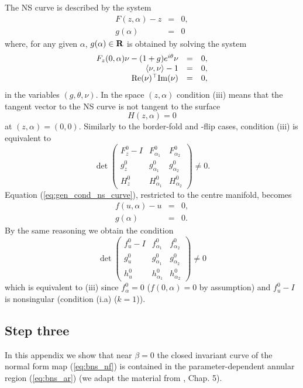 \documentclass[final,onefignum]{siamltex}
\begin{document}
The NS curve is described by the system 
\begin{equation}
\label{eq:gen_cond_ns_curve}
\begin{array}{rcl}
 F(z,\alpha)-z & = & 0,\\
 g(\alpha) & = & 0
\end{array}
\end{equation}
where, for any given $\alpha$, $g(\alpha)\in{{\bf R}}$ is obtained by solving the system
$$
\begin{array}{rcl}
 F_z(0,\alpha)\nu - (1+g)e^{i\theta}\nu & = & 0,\\
 \langle\nu,\nu\rangle -1 & = & 0,\\
 \mathrm{Re}(\nu){^{{\scriptscriptstyle}\top}}\mathrm{Im}(\nu) & = & 0,
\end{array}
$$
in the variables $(g,\theta,\nu)$.  In the space $(z,\alpha)$ condition (iii) means that the tangent vector to the NS curve is not tangent to the surface 
$$
H(z,\alpha)=0
$$
at $(z,\alpha)=(0,0)$.  Similarly to the border-fold and -flip cases, condition (iii) is equivalent to
$$
\det
\left(
\begin{array}{ccc}
F^0_z-I & F^0_{\alpha_1} & F^0_{\alpha_2}\\
g^0_z & g^0_{\alpha_1} & g^0_{\alpha_2}\\
H^0_z & H^0_{\alpha_1} & H^0_{\alpha_2}
\end{array}
\right)\neq 0.
$$
Equation (\ref{eq:gen_cond_ns_curve}), restricted to the centre manifold, becomes
$$
\begin{array}{rcl}
 f(u,\alpha)-u & = & 0,\\ g(\alpha) & = & 0.
\end{array}
$$
By the same reasoning we obtain the condition 
$$
\det
\left(
\begin{array}{ccc}
f^0_u-I & f^0_{\alpha_1} & f^0_{\alpha_2} \\
g^0_u & g^0_{\alpha_1} & g^0_{\alpha_2}\\
h^0_u & h^0_{\alpha_1} & h^0_{\alpha_2}
\end{array}
\right)\neq 0
$$
which is equivalent to (iii) since $f^0_\alpha=0$ ($f(0,\alpha)=0$ by assumption) and $f^0_u-I$ is nonsingular (condition (i.a) ($k=1$)). 

\subsection{Step three}
In this appendix we show that near $\beta=0$ the closed invariant curve of the normal form map (\ref{eq:bns_nf}) is contained in the parameter-dependent annular region (\ref{eq:bns_ar}) (we adapt the material from \citep{Kuznetsov10}, Chap. 5).
\end{document}
